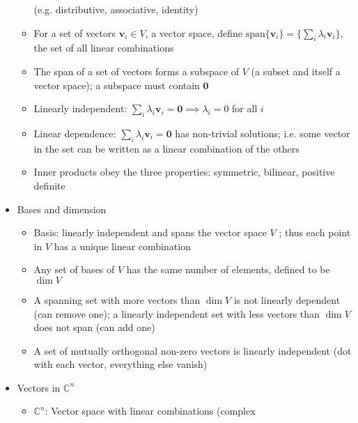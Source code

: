 \begin{itemize}
\begin{itemize}
                        (e.g. distributive, associative, identity)
                  \item For a set of vectors $\mathbf{v}_{i}\in V$, a vector space, define
                        $\textrm{span}\{\mathbf{v}_{i}\}=\{\sum_{i}\lambda_{i}\mathbf{v}_{i}\}$,
                        the set of all linear combinations
                  \item The span of a set of vectors forms a subspace of $V$ (a subset and
                        itself a vector space); a subspace must contain $\mathbf{0}$
                  \item Linearly independent: $\sum_{i}\lambda_{i}\mathbf{v}_{i}=\mathbf{0}\implies\lambda_{i}=0$
                        for all $i$
                  \item Linear dependence: $\sum_{i}\lambda_{i}\mathbf{v}_{i}=\mathbf{0}$
                        has non-trivial solutions; i.e. some vector in the set can be written
                        as a linear combination of the others
                  \item Inner products obey the three properties: symmetric, bilinear, positive
                        definite
            \end{itemize}
      \item Bases and dimension
            \begin{itemize}
                  \item Basis: linearly independent and spans the vector space $V$ ; thus
                        each point in $V$ has a unique linear combination
                  \item Any set of bases of $V$ has the same number of elements, defined
                        to be $\dim V$
                  \item A spanning set with more vectors than $\dim V$ is not linearly dependent
                        (can remove one); a linearly independent set with less vectors than
                        $\dim V$ does not span (can add one)
                  \item A set of mutually orthogonal non-zero vectors is linearly independent
                        (dot with each vector, everything else vanish)
            \end{itemize}
      \item Vectors in $\mathbb{C}^{n}$
            \begin{itemize}
                  \item $\mathbb{C}^{n}$: Vector space with linear combinations (complex

\end{itemize}
\end{itemize}
